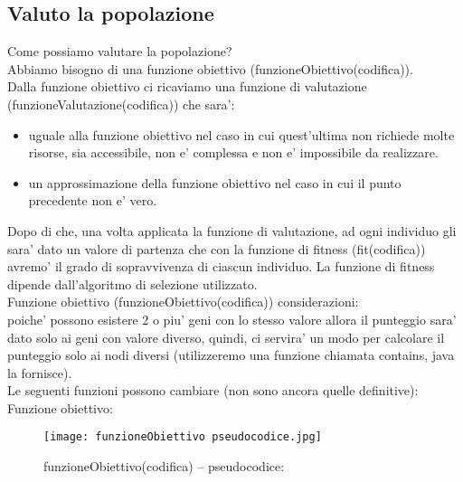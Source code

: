 \documentclass[10pt,a4paper]{article}
\begin{document}
    \subsection{Valuto la popolazione}
      \label{valutoLaPopolazioneSubsection}
      
      Come possiamo valutare la popolazione?\\
      Abbiamo bisogno di una funzione obiettivo (funzioneObiettivo(codifica)).\\
      Dalla funzione obiettivo ci ricaviamo una funzione di valutazione (funzioneValutazione(codifica)) che sara':
      \begin{itemize}
        \item uguale alla funzione obiettivo nel caso in cui quest'ultima non richiede molte risorse, 
        sia accessibile, non e' complessa e non e' impossibile da realizzare.
        \item un approssimazione della funzione obiettivo nel caso in cui il punto precedente non e' 
        vero.
      \end{itemize}
      Dopo di che, una volta applicata la funzione di valutazione, ad ogni individuo gli sara' dato un valore di 
      partenza che con la funzione di fitness (fit(codifica)) avremo' il grado di sopravvivenza di ciascun 
      individuo. La funzione di fitness dipende dall'algoritmo di selezione utilizzato.\\
      Funzione obiettivo (funzioneObiettivo(codifica)) considerazioni:\\
      poiche' possono esistere 2 o piu' geni con lo stesso valore allora il punteggio sara' dato solo ai 
      geni con valore diverso, quindi, ci servira' un modo per calcolare il punteggio solo ai nodi 
      diversi (utilizzeremo una funzione chiamata contains, java la fornisce).\\
      Le seguenti funzioni possono cambiare (non sono ancora quelle definitive):\\
      Funzione obiettivo:\\
      \begin{figure}[h!]
        \centering
        \caption{funzioneObiettivo(codifica) -- pseudocodice:}
        \texttt{[image: funzioneObiettivo pseudocodice.jpg]}
        \label{funzioneObiettivoPseudocodice}
      \end{figure}
\end{document}
